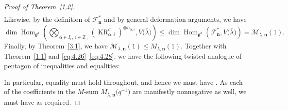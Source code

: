 \documentclass[pdftex]{sigma}
\numberwithin{equation}{section}
\DeclareMathOperator{\KR}{KR}
\DeclareMathOperator{\Hom}{Hom}
\begin{document}
\begin{proof}[Proof of Theorem~\ref{1.2}]
\begin{gather}
\end{gather}
Likewise, by the definition of $\mathcal{F}_{\mathbf{n}}^*$ and by general deformation arguments, we have
\begin{equation}\label{eq:4.28}
\dim\Hom_{\mathfrak{g}^{\sigma}}\left(\bigotimes_{\alpha\in I_r,\,i\in\mathbb{Z}_+}(\KR_{\alpha,i}^{\sigma})^{\otimes n_{\alpha,i}},V\bigl(\overline{\lambda}\bigr)\right)
\leq\dim\Hom_{\mathfrak{g}^{\sigma}}(\mathcal{F}_{ \mathbf{n}}^*,V\bigl(\overline{\lambda}\bigr))=\mathcal{M}_{\overline{\lambda},\mathbf{n}}(1).
\end{equation}
Finally, by Theorem~\ref{3.1}, we have $\mathcal{M}_{ \overline{\lambda},\mathbf{n}}(1)\leq M_{\overline{\lambda}, \mathbf{n}}(1)$. Together with Theorem~\ref{1.1} and \eqref{eq:4.26}--\eqref{eq:4.28}, we have the following twisted analogue of pentagon of inequalities and equalities:
\begin{center}
\end{center}
In particular, equality must hold throughout, and hence we must have . As each of the coefficients in the $M$-sum $M_{\overline{ \lambda},\mathbf{n}}\bigl(q^{-1}\bigr)$ are manifestly nonnegative as well, we must have  as required.
\end{proof}
\end{document}
